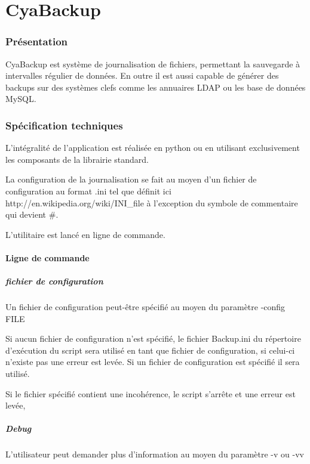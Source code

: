 \part*{CyaBackup}

\section*{Présentation}
CyaBackup est système de journalisation de fichiers, permettant la sauvegarde à intervalles régulier de données.
En outre il est aussi capable de générer des backups sur des systèmes clefs comme les annuaires LDAP ou les base de données MySQL.


\section*{Spécification techniques}
L'intégralité de l'application est réalisée en python ou en utilisant exclusivement les composants de la librairie standard.

La configuration de la journalisation se fait au moyen d'un fichier de configuration au format .ini tel que définit ici http://en.wikipedia.org/wiki/INI\_file à l'exception du symbole de commentaire qui devient \#.

L'utilitaire est lancé en ligne de commande.

\subsection*{Ligne de commande}

\subsubsection*{fichier de configuration}
	
Un fichier de configuration peut-être spécifié au moyen du paramètre -config FILE

Si aucun fichier de configuration n'est spécifié, le fichier Backup.ini du répertoire d'exécution du script sera utilisé en tant que fichier de configuration, si celui-ci n'existe pas une erreur est levée.
Si un fichier de configuration est spécifié il sera utilisé.

Si le fichier spécifié contient une incohérence, le script s'arrête et une erreur est levée,
	
\subsubsection*{Debug}	
	L'utilisateur peut demander plus d'information au moyen du paramètre -v ou -vv

